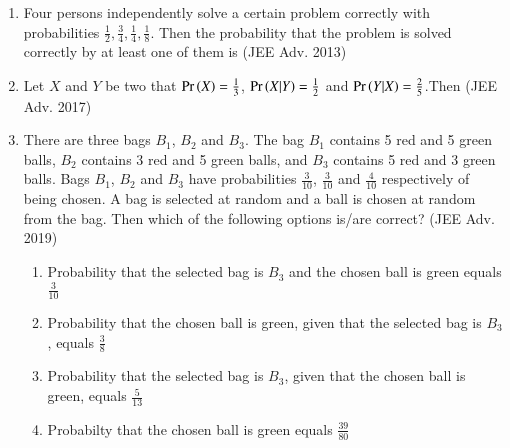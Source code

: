 \documentclass[journal,,12pt,onecolumn]{IEEEtran}
\theoremstyle{remark}
\begin{document}
\begin{enumerate}
\begin{enumerate}
        \end{enumerate}
        \item Four persons independently solve a certain problem correctly with probabilities $\frac{1}{2},\frac{3}{4},\frac{1}{4},\frac{1}{8}$. Then the probability that the problem is solved correctly by at least one of them is 
        \hfill{(JEE Adv. 2013)}
        \begin{enumerate}
        \end{enumerate}
\item Let $X$ and $Y$ be two that $\Pr\left(X\right)=\frac{1}{3}$, $\Pr\left(X|Y\right)=\frac{1}{2}$ and $\Pr\left(Y|X\right)=\frac{2}{5}$.Then 
        \hfill{(JEE Adv. 2017)}
        \begin{enumerate}
        \end{enumerate}
    \item There are three bags $B_1$, $B_2$ and $B_3$. The bag $B_1$ contains 5 red and 5 green balls, $B_2$ contains 3 red and 5 green balls, and $B_3$ contains 5 red and 3 green balls. Bags $B_1$, $B_2$ and $B_3$ have probabilities $\frac{3}{10}$, $\frac{3}{10}$ and $\frac{4}{10}$ respectively of being chosen. A bag is selected at random and a ball is chosen at random from the bag. Then which of the following options is/are correct?
    \hfill{(JEE Adv. 2019)}
    \begin{enumerate}
    
        \item Probability that the selected bag is $B_3$ and the chosen ball is green equals $\frac{3}{10}$
        \item Probability that the chosen ball is green, given that the selected bag is $B_3$, equals $\frac{3}{8}$
        \item Probability that the selected bag is $B_3$, given that the chosen ball is green, equals $\frac{5}{13}$
        \item Probabilty that the chosen ball is green equals $\frac{39}{80}$
       \end{enumerate}
       \end{enumerate}
\end{document}
